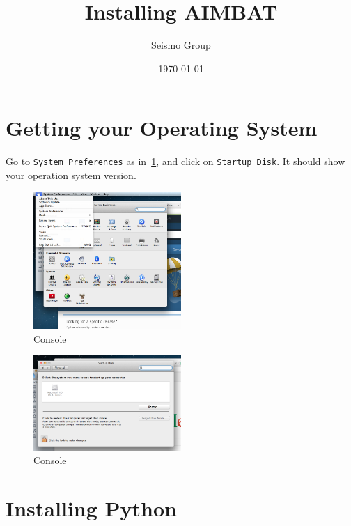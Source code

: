 \documentclass[letterpaper,10pt]{article}
\title{Installing AIMBAT}
\author{Seismo Group}
\date{\today}
\begin{document}
\maketitle


\section{Getting your Operating System}

Go to \verb"System Preferences" as in~\ref{fig:system_preferences}, and click on \verb"Startup Disk". It should show your operation system version.

\begin{figure}[h!]
  \centering
  \includegraphics[width=0.5\textwidth]{images/system_preferences}
  \caption{Console}
  \label{fig:system_preferences}
\end{figure}

\begin{figure}[h!]
  \centering
  \includegraphics[width=0.5\textwidth]{images/startup_disk}
  \caption{Console}
  \label{fig:startup_disk}
\end{figure}


\section{Installing Python}
\end{document}
